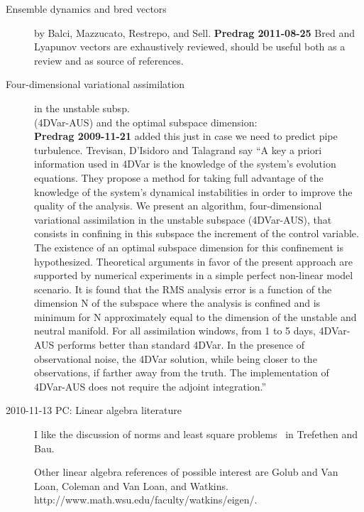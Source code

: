 \begin{description}
\item[Ensemble dynamics and bred vectors]
by Balci, {Mazzucato}, {Restrepo}, and Sell.
{\bf Predrag 2011-08-25} Bred and Lyapunov vectors are
exhaustively reviewed, should be useful both as a review
and as source of references.

\item[Four-dimensional variational assimilation]
	{in the unstable subsp. \\
      (4DVar-AUS) and the optimal subspace dimension}:
	\\
{\bf Predrag
2009-11-21} added this just in case we need to predict pipe turbulence.
Trevisan, D'Isidoro and Talagrand say
``A key a priori information used in 4DVar is the knowledge of the
system's evolution equations. They propose a method for taking full
advantage of the knowledge of the system's dynamical instabilities in
order to improve the quality of the analysis. We present an
algorithm, four-dimensional variational assimilation in the unstable
subspace (4DVar-AUS), that consists in confining in this subspace the
increment of the control variable. The existence of an optimal
subspace dimension for this confinement is hypothesized. Theoretical
arguments in favor of the present approach are supported by numerical
experiments in a simple perfect non-linear model scenario. It is
found that the RMS analysis error is a function of the dimension N of
the subspace where the analysis is confined and is minimum for N
approximately equal to the dimension of the unstable and neutral
manifold. For all assimilation windows, from 1 to 5 days, 4DVar-AUS
performs better than standard 4DVar. In the presence of observational
noise, the 4DVar solution, while being closer to the observations, if
farther away from the truth. The implementation of 4DVar-AUS does not
require the adjoint integration.''

\item[2010-11-13 PC: Linear algebra literature]             \inCB
I like the discussion of norms and least square problems \etc\
in Trefethen and Bau.

Other linear algebra references of possible interest are
Golub and Van Loan,
Coleman and Van Loan, and Watkins.
\\
  {http://www.math.wsu.edu/faculty/watkins/eigen/}.


\end{description}
